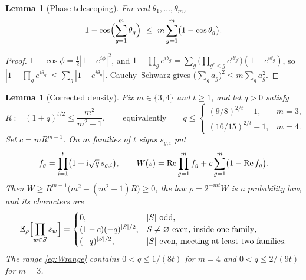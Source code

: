 \documentclass[11pt]{article}
\theoremstyle{plain}
\newtheorem{lemma}[theorem]{Lemma}
\theoremstyle{definition}
\newcommand{\E}{\mathbb E}
\begin{document}
\begin{lemma}[Phase telescoping]\label{lem:telescope}
For real $\theta_1,\dots,\theta_m$,
\[
1-\cos\Bigl(\sum_{g=1}^m\theta_g\Bigr)\ \le\ m\sum_{g=1}^m\bigl(1-\cos\theta_g\bigr).
\]
\end{lemma}

\begin{proof}
$1-\cos\phi=\tfrac12|1-e^{i\phi}|^2$, and
$1-\prod_ge^{i\theta_g}=\sum_g\bigl(\prod_{g'<g}e^{i\theta_{g'}}\bigr)(1-e^{i\theta_g})$,
so $|1-\prod_ge^{i\theta_g}|\le\sum_g|1-e^{i\theta_g}|$. Cauchy--Schwarz gives $\bigl(\sum_g a_g\bigr)^2\le m\sum_ga_g^2$.
\end{proof}

\begin{lemma}[Corrected density]\label{lem:corrected}
Fix $m\in\{3,4\}$ and $t\ge1$, and let $q>0$ satisfy
\begin{equation}\label{eq:Wrange}
R:=(1+q)^{t/2}\le\frac{m^2}{m^2-1},\qquad\text{equivalently}\qquad
q\le\begin{cases}
(9/8)^{2/t}-1,&m=3,\\
(16/15)^{2/t}-1,&m=4.
\end{cases}
\end{equation}
Set $c=mR^{m-1}$. On $m$ families of $t$ signs $s_{g,i}$ put
\begin{equation}\label{eq:Wdensity}
f_g=\prod_{i=1}^t\bigl(1+\mathrm{i}\sqrt q\,s_{g,i}\bigr),\qquad
W(s)=\operatorname{Re}\prod_{g=1}^mf_g+c\sum_{g=1}^m\bigl(1-\operatorname{Re} f_g\bigr).
\end{equation}
Then $W\ge R^{m-1}\bigl(m^2-(m^2-1)R\bigr)\ge0$, the law $\rho=2^{-mt}W$ is a probability law, and its characters are
\begin{equation}\label{eq:Wmoments}
\E_\rho\Bigl[\prod_{w\in S}s_w\Bigr]=
\begin{cases}
0,&|S|\text{ odd},\\
(1-c)(-q)^{|S|/2},&S\ne\varnothing\text{ even, inside one family},\\
(-q)^{|S|/2},&|S|\text{ even, meeting at least two families}.
\end{cases}
\end{equation}
The range \eqref{eq:Wrange} contains $0<q\le1/(8t)$ for $m=4$ and $0<q\le2/(9t)$ for $m=3$.
\end{lemma}
\end{document}
